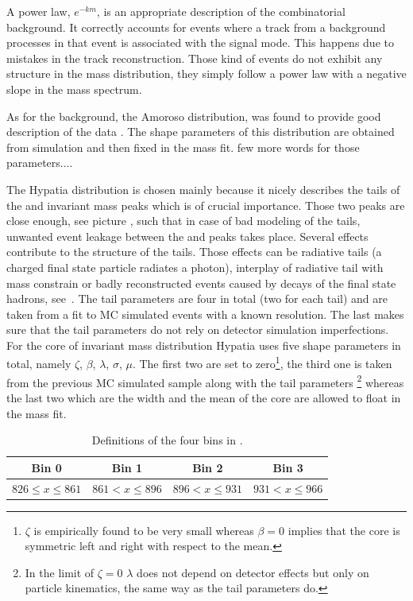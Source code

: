 \noindent A power law, $e^{-km}$, is an appropriate description of the combinatorial background. It correctly accounts for events where
a track from a background processes in that event is associated with the signal mode. This happens due to mistakes in the track reconstruction.
Those kind of events do not exhibit any structure in the mass distribution, they simply follow a power law with a negative slope in the mass spectrum. 

As for the \LbJpsippi background, the Amoroso distribution, was found to provide good description of the data . 
The shape parameters of this distribution are obtained from simulation and then fixed in the mass fit. {\color{red} few more words for those parameters....}

The Hypatia distribution is chosen mainly because it nicely describes the tails of the \Bs and \Bd invariant mass peaks which is
of crucial importance. Those two peaks are close enough,
see picture , such that in case of bad modeling of the tails, unwanted event leakage between the \Bs and \Bd peaks 
takes place. Several effects contribute to the structure of the tails. Those effects can be radiative tails (a charged final state 
particle radiates a photon), interplay of radiative tail with \Jpsi mass constrain or badly reconstructed events caused by decays 
of the final state hadrons, see~\cite{Santos:2013gra}. The tail parameters are four in total (two for each tail) and are taken
from a fit to MC simulated events with a known resolution. The last makes sure that the tail parameters do not rely on detector 
simulation imperfections. For the core of invariant mass distribution Hypatia uses five shape parameters in total, namely $\zeta$, 
$\beta$, $\lambda$, $\sigma$, $\mu$. The first two are set to zero\footnote{$\zeta$ is empirically found to be very small whereas
$\beta = 0$ implies that the core is symmetric left and right with respect to the mean.}, the third one is taken from the previous
MC simulated sample along with the tail parameters \footnote{In the limit of $\zeta = 0$ $\lambda$ does not depend on detector 
effects but only on particle kinematics, the same way as the tail parameters do.} whereas the last two which are the width and 
the mean of the core are allowed to float in the mass fit.

\begin{table}[!h]
\centering
\begin{tabular}{c|c|c|c}
\hline
 Bin 0 & Bin 1 & Bin 2 & Bin 3\\	
\hline
\multirow{2}{*}{$ 826 \leq x \leq 861 $} & \multirow{2}{*}{$ 861 < x \leq 896 $} & \multirow{2}{*}{$ 896 < x \leq 931 $}& \multirow{2}{*}{$ 931 < x \leq 966 $} \\
					      	 					  &   &	& \\	
\hline
 \end{tabular}
\caption{Definitions of the four \mkpi bins in \mevcc.}
\label{Kbindef}
\end{table}


